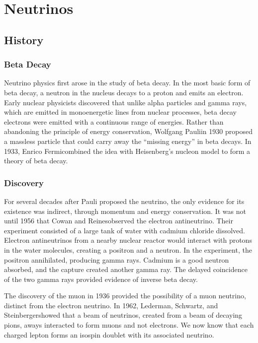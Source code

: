 \documentclass[herrin-thesis.tex]{subfiles}
\begin{document}
\chapter{Neutrinos}
\label{ch:neutrinos}

\section{History}
\subsection{Beta Decay}
Neutrino physics first arose in the study of beta decay. In the most basic form of beta decay, a neutron in the nucleus decays to a proton and emits an electron. Early nuclear physicists discovered that unlike alpha particles and gamma rays, which are emitted in monoenergetic lines from nuclear processes, beta decay electrons were emitted with a continuous range of energies. Rather than abandoning the principle of energy conservation, Wolfgang Pauli\addref in 1930 proposed a massless particle that could carry away the ``missing energy'' in beta decays. In 1933, Enrico Fermi\addref combined the idea with Heisenberg's nucleon model to form a theory of beta decay.

\subsection{Discovery}
For several decades after Pauli proposed the neutrino, the only evidence for its existence was indirect, through momentum and energy conservation. It was not until 1956 that Cowan and Reines\addref observed the electron antineutrino. Their experiment consisted of a large tank of water with cadmium chloride dissolved. Electron antineutrinos from a nearby nuclear reactor would interact with protons in the water molecules, creating a positron and a neutron. In the experiment, the positron annihilated, producing gamma rays. Cadmium is a good neutron absorbed, and the capture created another gamma ray. The delayed coincidence of the two gamma rays provided evidence of inverse beta decay.

The discovery of the muon in 1936 provided the possibility of a muon neutrino, distinct from the electron neutrino. In 1962, Lederman, Schwartz, and Steinberger\addref showed that a beam of neutrinos, created from a beam of decaying pions, aways interacted to form muons and not electrons. We now know that each charged lepton forms an isospin doublet with its associated neutrino.
\end{document}
